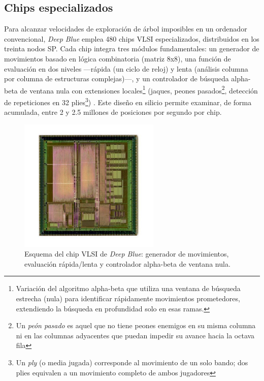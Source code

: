 \documentclass[a4paper, 12pt]{article}
\begin{document}
\subsection{Chips especializados}

Para alcanzar velocidades de exploración de árbol imposibles en 
un ordenador convencional, \textit{Deep Blue} emplea 480 chips 
VLSI especializados, distribuidos en los treinta nodos SP. Cada 
chip integra tres módulos fundamentales: un generador de 
movimientos basado en lógica combinatoria (matriz 8x8), una 
función de evaluación en dos niveles —rápida (un ciclo de reloj) 
y lenta (análisis columna por columna de estructuras complejas)—, 
y un controlador de búsqueda alpha-beta de ventana nula con 
extensiones locales\footnote{Variación del algoritmo alpha-beta que utiliza una ventana de búsqueda estrecha (nula) para identificar rápidamente movimientos prometedores, extendiendo la búsqueda en profundidad solo en esas ramas.} 
(jaques, peones pasados\footnote{Un \emph{peón pasado} 
es aquel que no tiene peones enemigos en su misma columna ni en 
las columnas adyacentes que puedan impedir su avance hacia la 
octava fila}, detección de 
repeticiones en 32 plies\footnote{Un \emph{ply} (o media jugada) 
corresponde al movimiento de un solo bando; dos plies equivalen 
a un movimiento completo de ambos jugadores}) \cite{campbell2002deep}. Este diseño en 
silicio permite examinar, de forma acumulada, entre 2 y 2.5 
millones de posiciones por segundo por chip. \cite{hsu1999ibm}

\begin{figure}[h!]
    \centering
    \includegraphics[width=0.6\textwidth]{assets/deep-blue-chip.jpg}
    \caption{Esquema del chip VLSI de \textit{Deep Blue}: generador de movimientos, evaluación rápida/lenta y controlador alpha-beta de ventana nula.}
    \label{fig:chip_vlsi}
\end{figure}
\end{document}
